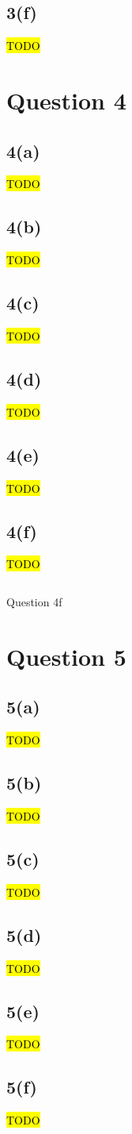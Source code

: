 \documentclass[10pt, a4paper,reqno]{article}
\begin{document}
\subsection*{3(f)}
\hl{TODO}


%
%
\clearpage\section*{Question 4}

\subsection*{4(a)}
\hl{TODO}

\subsection*{4(b)}
\hl{TODO}

\subsection*{4(c)}
\hl{TODO}

\subsection*{4(d)}
\hl{TODO}

\subsection*{4(e)}
\hl{TODO}

\subsection*{4(f)}
\hl{TODO}

\begin{listing}
\inputminted[linenos]{python}{question_4f.py}
\caption{Question 4f}
\end{listing}


%
%
\clearpage\section*{Question 5}

\subsection*{5(a)}
\hl{TODO}

\subsection*{5(b)}
\hl{TODO}

\subsection*{5(c)}
\hl{TODO}

\subsection*{5(d)}
\hl{TODO}

\subsection*{5(e)}
\hl{TODO}

\subsection*{5(f)}
\hl{TODO}
\end{document}
